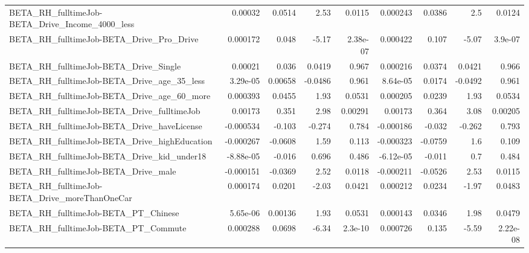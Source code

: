 \begin{tabular}{lrrrrrrrr}
BETA\_RH\_fulltimeJob-BETA\_Drive\_Income\_4000\_less    &     0.00032 &       0.0514 &      2.53 &   0.0115 &   0.000243 &      0.0386 &          2.5 &        0.0124 \\
BETA\_RH\_fulltimeJob-BETA\_Drive\_Pro\_Drive           &    0.000172 &        0.048 &     -5.17 & 2.38e-07 &   0.000422 &       0.107 &        -5.07 &       3.9e-07 \\
BETA\_RH\_fulltimeJob-BETA\_Drive\_Single              &     0.00021 &        0.036 &    0.0419 &    0.967 &   0.000216 &      0.0374 &       0.0421 &         0.966 \\
BETA\_RH\_fulltimeJob-BETA\_Drive\_age\_35\_less         &    3.29e-05 &      0.00658 &   -0.0486 &    0.961 &   8.64e-05 &      0.0174 &      -0.0492 &         0.961 \\
BETA\_RH\_fulltimeJob-BETA\_Drive\_age\_60\_more         &    0.000393 &       0.0455 &      1.93 &   0.0531 &   0.000205 &      0.0239 &         1.93 &        0.0534 \\
BETA\_RH\_fulltimeJob-BETA\_Drive\_fulltimeJob         &     0.00173 &        0.351 &      2.98 &  0.00291 &    0.00173 &       0.364 &         3.08 &       0.00205 \\
BETA\_RH\_fulltimeJob-BETA\_Drive\_haveLicense         &   -0.000534 &       -0.103 &    -0.274 &    0.784 &  -0.000186 &      -0.032 &       -0.262 &         0.793 \\
BETA\_RH\_fulltimeJob-BETA\_Drive\_highEducation       &   -0.000267 &      -0.0608 &      1.59 &    0.113 &  -0.000323 &     -0.0759 &          1.6 &         0.109 \\
BETA\_RH\_fulltimeJob-BETA\_Drive\_kid\_under18         &   -8.88e-05 &       -0.016 &     0.696 &    0.486 &  -6.12e-05 &      -0.011 &          0.7 &         0.484 \\
BETA\_RH\_fulltimeJob-BETA\_Drive\_male                &   -0.000151 &      -0.0369 &      2.52 &   0.0118 &  -0.000211 &     -0.0526 &         2.53 &        0.0115 \\
BETA\_RH\_fulltimeJob-BETA\_Drive\_moreThanOneCar      &    0.000174 &       0.0201 &     -2.03 &   0.0421 &   0.000212 &      0.0234 &        -1.97 &        0.0483 \\
BETA\_RH\_fulltimeJob-BETA\_PT\_Chinese                &    5.65e-06 &      0.00136 &      1.93 &   0.0531 &   0.000143 &      0.0346 &         1.98 &        0.0479 \\
BETA\_RH\_fulltimeJob-BETA\_PT\_Commute                &    0.000288 &       0.0698 &     -6.34 &  2.3e-10 &   0.000726 &       0.135 &        -5.59 &      2.22e-08 \\

\end{tabular}
